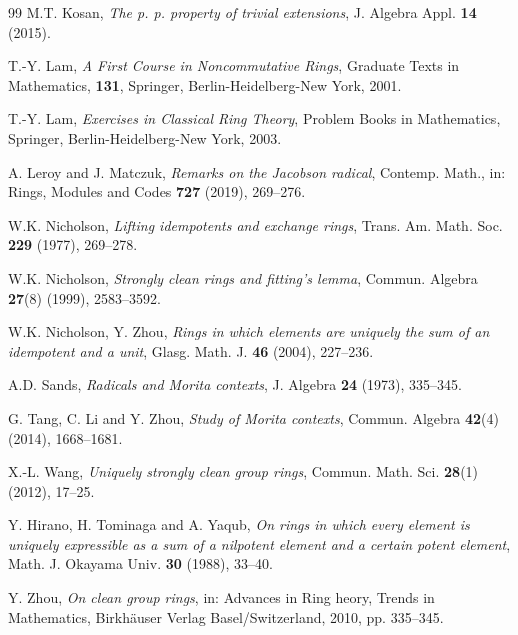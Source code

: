 \documentclass[12pt]{amsart}
\theoremstyle{definition}
\begin{document}
\begin{thebibliography}{99}
M.T. Kosan, {\it The p. p. property of trivial extensions}, J. Algebra Appl. {\bf 14} (2015).

T.-Y. Lam, {\it A First Course in Noncommutative Rings}, Graduate Texts in Mathematics, {\bf 131}, Springer, Berlin-Heidelberg-New York, 2001.

T.-Y. Lam, {\it Exercises in Classical Ring Theory}, Problem Books in Mathematics, Springer, Berlin-Heidelberg-New York, 2003.

A. Leroy and J. Matczuk, {\it Remarks on the Jacobson radical}, Contemp. Math., in: Rings, Modules and Codes {\bf 727} (2019), 269--276.

W.K. Nicholson, {\it Lifting idempotents and exchange rings}, Trans. Am. Math. Soc. {\bf 229} (1977), 269--278.

W.K. Nicholson, {\it Strongly clean rings and fitting's lemma}, Commun. Algebra {\bf 27}(8) (1999), 2583--3592.

W.K. Nicholson, Y. Zhou, {\it Rings in which elements are uniquely the sum of an idempotent and a unit}, Glasg. Math. J. {\bf 46} (2004), 227--236.

A.D. Sands, {\it Radicals and Morita contexts}, J. Algebra {\bf 24} (1973), 335--345.

G. Tang, C. Li and Y. Zhou, {\it Study of Morita contexts}, Commun. Algebra {\bf 42}(4) (2014), 1668--1681.

X.-L. Wang, {\it Uniquely strongly clean group rings}, Commun. Math. Sci. {\bf 28}(1) (2012), 17--25.

Y. Hirano, H. Tominaga and A. Yaqub, {\it On rings in which every element is uniquely expressible as a sum of a nilpotent element and a certain potent element}, Math. J. Okayama Univ. {\bf 30} (1988), 33--40.

Y. Zhou, {\it On clean group rings}, in: Advances in Ring heory, Trends in Mathematics, Birkh\"auser Verlag Basel/Switzerland, 2010, pp. 335--345.

\end{thebibliography}
\end{document}
